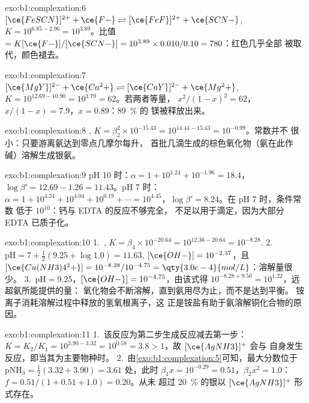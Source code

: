 \begin{solution}{exo:b1:complexation:6}
$[\ce{FeSCN}]^{2+} + \ce{F-} \rightleftharpoons [\ce{FeF}]^{2+} + \ce{SCN-}$,
$K = 10^{6.85 - 2.96} = 10^{3.89}$。比值 $= K[\ce{F-}]/[\ce{SCN-}] =
10^{3.89} \times 0.010/0.10 = 780$：红色几乎全部
被取代，颜色褪去。
\end{solution}

\begin{solution}{exo:b1:complexation:7}
$[\ce{MgY}]^{2-} + \ce{Ca^2+} \rightleftharpoons [\ce{CaY}]^{2-} + \ce{Mg^2+}$,
$K = 10^{12.69 - 10.90} = 10^{1.79} = 62$。若两者等量，
$x^2/(1 - x)^2 = 62$，$x/(1 - x) = 7.9$，$x = 0.89$：\qty{89}{\percent} 的
镁被释放出来。
\end{solution}

\begin{solution}{exo:b1:complexation:8}
, $K = \beta_2^2 \times
10^{-15.43} = 10^{14.44 - 15.43} = 10^{-0.99}$。常数并不
很小：只要游离氨达到零点几摩尔每升，
首批几滴生成的棕色氧化物（氨在此作
碱）溶解生成银氨。
\end{solution}

\begin{solution}{exo:b1:complexation:9}
pH 10 时：$\alpha = 1 + 10^{1.24} + 10^{-1.96} = 18.4$，$\log\beta' = 12.69 -
1.26 = 11.43$。pH 7 时：$\alpha = 1 + 10^{4.24} + 10^{4.04} + 10^{0.19} +
\cdots = 10^{4.45}$，$\log\beta' = 8.24$。在 pH 7 时，条件常数
低于 $10^{10}$：钙与 EDTA 的反应不够完全，
不足以用于滴定，因为大部分 EDTA 已质子化。
\end{solution}

\begin{solution}{exo:b1:complexation:10}
1.~, $K = \beta_4 \times
10^{-20.64} = 10^{12.36 - 20.64} = 10^{-8.28}$.
2.~$\mathrm{pH} = 7 + \frac12(9.25 + \log 1.0) = 11.63$, $[\ce{OH-}] =
10^{-2.37}$，且 $[\ce{Cu(NH3)4^2+}] = 10^{-8.28}/10^{-4.75} =
\qty{3.0e-4}{mol/L}$：溶解量很少。
3.~$\mathrm{pH} = 9.25$，$[\ce{OH-}] = 10^{-4.75}$，由该式得
$10^{-8.28 + 9.50} = 10^{1.22}$，远超氨所能提供的量：
氧化物会不断溶解，直到氨用尽为止，而不是达到平衡。
铵离子消耗溶解过程中释放的氢氧根离子，这
正是铵盐有助于氨溶解铜化合物的原因。
\end{solution}

\begin{solution}{exo:b1:complexation:11}
1.~该反应为第二步生成反应减去第一步：$K = K_2/K_1 =
10^{3.90 - 3.32} = 10^{0.58} = 3.8 > 1$，故 $[\ce{AgNH3}]^{+}$ 会与
自身发生反应，即当其为主要物种时。
2.~由\cref{exo:b1:complexation:5}可知，最大分数位于
$\mathrm{pNH_3} = \frac12(3.32 + 3.90) = 3.61$ 处，此时 $\beta_1 x = 10^{-0.29}
= 0.51$，$\beta_2x^2 = 1.0$：$f = 0.51/(1 + 0.51 + 1.0) = 0.20$。从未
超过 \qty{20}{\percent} 的银以 $[\ce{AgNH3}]^{+}$ 形式存在。
\end{solution}


